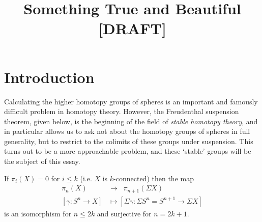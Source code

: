 \documentclass{MetricNotes2023}
\author{\vspace{-5ex}}
\title{Something True and Beautiful [DRAFT]}
\date{\vspace{-5ex}}
\def\textcolour{\textcolor}
\begin{document}
\maketitle


\DeclarePairedDelimiter{\norm}{\lVert}{\rVert} 
\DeclarePairedDelimiter{\abs}{\lvert}{\rvert} 
\DeclarePairedDelimiter{\ang}{\langle}{\rangle} 

\tableofcontents

\pagebreak





\section{Introduction}

Calculating the higher homotopy groups of spheres is an important and famously difficult problem in homotopy theory. However, the Freudenthal suspension theorem, given below, is the beginning of the field of \textit{stable homotopy theory}, and in particular allows us to ask not about the homotopy groups of spheres in full generality, but to restrict to the colimits of these groups under suspension. This turns out to be a more approachable problem, and these `stable' groups will be the subject of this essay. 

\begin{theorem}\label{2504151046}
If \(\pi_i(X)=0\) for \(i\leq k\) (i.e. \(X\) is \(k\)-connected) then the map 
\begin{align*}
\pi_n(X) \;\;&\to\;\; \pi_{n+1}(\Sigma X)\\
[\gamma : S^n \to X] &\mapsto [\Sigma \gamma : \Sigma S^n=S^{n+1} \to \Sigma X]
\end{align*}
is an isomorphism for \(n \leq 2k\) and surjective for \(n=2k+1\).
\end{theorem}
\end{document}
